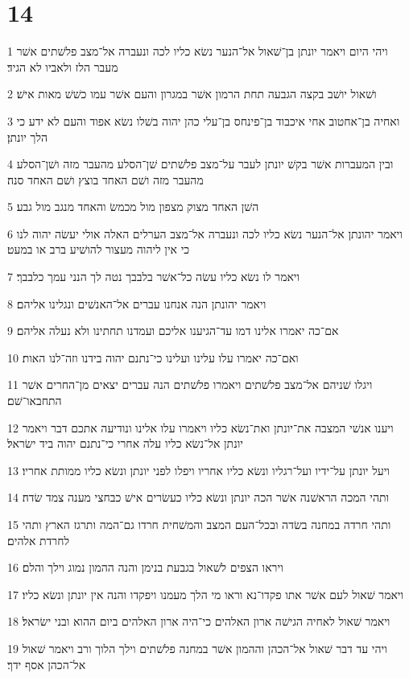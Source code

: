 \chapter{14}

\par 1 ויהי היום ויאמר יונתן בן־שׁאול אל־הנער נשׂא כליו לכה ונעברה אל־מצב פלשׁתים אשׁר מעבר הלז ולאביו לא הגיד׃
\par 2 ושׁאול יושׁב בקצה הגבעה תחת הרמון אשׁר במגרון והעם אשׁר עמו כשׁשׁ מאות אישׁ׃
\par 3 ואחיה בן־אחטוב אחי איכבוד בן־פינחס בן־עלי כהן יהוה בשׁלו נשׂא אפוד והעם לא ידע כי הלך יונתן׃
\par 4 ובין המעברות אשׁר בקשׁ יונתן לעבר על־מצב פלשׁתים שׁן־הסלע מהעבר מזה ושׁן־הסלע מהעבר מזה ושׁם האחד בוצץ ושׁם האחד סנה׃
\par 5 השׁן האחד מצוק מצפון מול מכמשׂ והאחד מנגב מול גבע׃
\par 6 ויאמר יהונתן אל־הנער נשׂא כליו לכה ונעברה אל־מצב הערלים האלה אולי יעשׂה יהוה לנו כי אין ליהוה מעצור להושׁיע ברב או במעט׃
\par 7 ויאמר לו נשׂא כליו עשׂה כל־אשׁר בלבבך נטה לך הנני עמך כלבבך׃
\par 8 ויאמר יהונתן הנה אנחנו עברים אל־האנשׁים ונגלינו אליהם׃
\par 9 אם־כה יאמרו אלינו דמו עד־הגיענו אליכם ועמדנו תחתינו ולא נעלה אליהם׃
\par 10 ואם־כה יאמרו עלו עלינו ועלינו כי־נתנם יהוה בידנו וזה־לנו האות׃
\par 11 ויגלו שׁניהם אל־מצב פלשׁתים ויאמרו פלשׁתים הנה עברים יצאים מן־החרים אשׁר התחבאו־שׁם׃
\par 12 ויענו אנשׁי המצבה את־יונתן ואת־נשׂא כליו ויאמרו עלו אלינו ונודיעה אתכם דבר ויאמר יונתן אל־נשׂא כליו עלה אחרי כי־נתנם יהוה ביד ישׂראל׃
\par 13 ויעל יונתן על־ידיו ועל־רגליו ונשׂא כליו אחריו ויפלו לפני יונתן ונשׂא כליו ממותת אחריו׃
\par 14 ותהי המכה הראשׁנה אשׁר הכה יונתן ונשׂא כליו כעשׂרים אישׁ כבחצי מענה צמד שׂדה׃
\par 15 ותהי חרדה במחנה בשׂדה ובכל־העם המצב והמשׁחית חרדו גם־המה ותרגז הארץ ותהי לחרדת אלהים׃
\par 16 ויראו הצפים לשׁאול בגבעת בנימן והנה ההמון נמוג וילך והלם׃
\par 17 ויאמר שׁאול לעם אשׁר אתו פקדו־נא וראו מי הלך מעמנו ויפקדו והנה אין יונתן ונשׂא כליו׃
\par 18 ויאמר שׁאול לאחיה הגישׁה ארון האלהים כי־היה ארון האלהים ביום ההוא ובני ישׂראל׃
\par 19 ויהי עד דבר שׁאול אל־הכהן וההמון אשׁר במחנה פלשׁתים וילך הלוך ורב ויאמר שׁאול אל־הכהן אסף ידך׃
